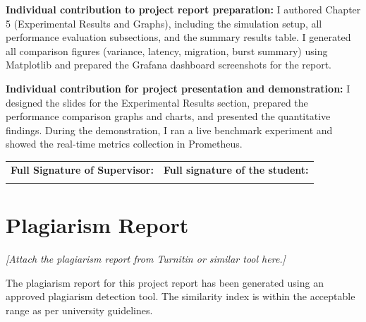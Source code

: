 \documentclass[12pt,a4paper]{report}
\begin{document}
\vspace{0.5cm}
\noindent\textbf{Individual contribution to project report preparation:} I authored Chapter 5 (Experimental Results and Graphs), including the simulation setup, all performance evaluation subsections, and the summary results table. I generated all comparison figures (variance, latency, migration, burst summary) using Matplotlib and prepared the Grafana dashboard screenshots for the report.

\vspace{0.5cm}
\noindent\textbf{Individual contribution for project presentation and demonstration:} I designed the slides for the Experimental Results section, prepared the performance comparison graphs and charts, and presented the quantitative findings. During the demonstration, I ran a live benchmark experiment and showed the real-time metrics collection in Prometheus.

\vspace{1.5cm}
\noindent\begin{tabular}{p{7cm}p{7cm}}
\textbf{Full Signature of Supervisor:} & \textbf{Full signature of the student:} \\
\dotfill & \dotfill \\
\end{tabular}

\newpage
\thispagestyle{fancy}
\chapter*{Plagiarism Report}

\textit{[Attach the plagiarism report from Turnitin or similar tool here.]}

\vspace{1cm}
\noindent The plagiarism report for this project report has been generated using an approved plagiarism detection tool. The similarity index is within the acceptable range as per university guidelines.
\end{document}
